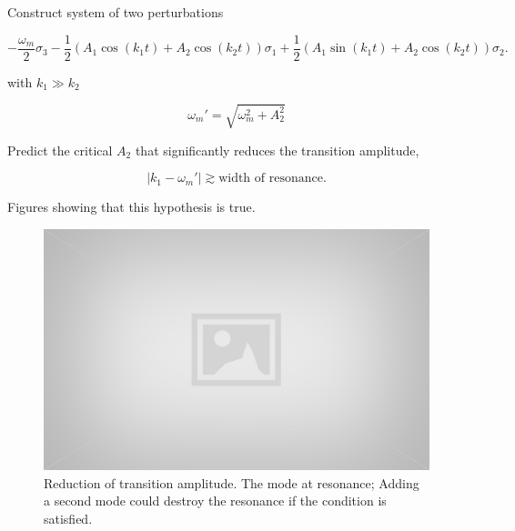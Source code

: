 \documentclass[%
preprint,
 amsmath,amssymb,
 aps,
]{revtex4-1}
\begin{document}
\begin{itemize}
\begin{itemize}
            
            Construct system of two perturbations

\begin{equation}
-\frac{\omega_m}{2} \sigma_3 - \frac{1}{2} \left(A_1 \cos(k_1 t) + A_2 \cos(k_2t) \right) \sigma_1 + \frac{1}{2} \left( A_1 \sin (k_1t) + A_2 \cos(k_2t) \right) \sigma_2.
\end{equation}

with $k_1 \gg k_2$

\begin{equation}
\omega_m' = \sqrt{\omega_m^2 + A_2^2}
\end{equation}

Predict the critical $A_2$ that significantly reduces the transition amplitude,

\begin{equation}
\lvert k_1 - \omega_m' \rvert \gtrsim \text{width of resonance}.
\end{equation}

Figures showing that this hypothesis is true.

\begin{figure}[!htbp]
    \centering
    \includegraphics[width=\textwidth]{assets/placeholder.jpg}
    \caption{Reduction of transition amplitude. The mode at resonance; Adding a second mode could destroy the resonance if the condition is satisfied. }
    \label{fig:my_label}
\end{figure}


        \end{itemize}
    
\end{itemize}
    
\end{document}
